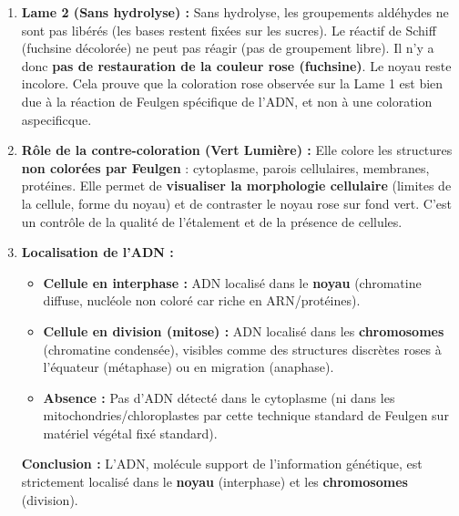 \documentclass[11pt]{article}
\begin{document}
\begin{exoresolu}
\begin{enumerate}
    \item \textbf{Lame 2 (Sans hydrolyse) :} Sans hydrolyse, les groupements aldéhydes ne sont pas libérés (les bases restent fixées sur les sucres). Le réactif de Schiff (fuchsine décolorée) ne peut pas réagir (pas de groupement  libre). Il n'y a donc \textbf{pas de restauration de la couleur rose (fuchsine)}. Le noyau reste incolore. Cela prouve que la coloration rose observée sur la Lame 1 est bien due à la réaction de Feulgen spécifique de l'ADN, et non à une coloration aspecificque.
    \item \textbf{Rôle de la contre-coloration (Vert Lumière) :} Elle colore les structures \textbf{non colorées par Feulgen} : cytoplasme, parois cellulaires, membranes, protéines. Elle permet de \textbf{visualiser la morphologie cellulaire} (limites de la cellule, forme du noyau) et de contraster le noyau rose sur fond vert. C'est un contrôle de la qualité de l'étalement et de la présence de cellules.
    \item \textbf{Localisation de l'ADN :}
        \begin{itemize}
            \item \textbf{Cellule en interphase :} ADN localisé dans le \textbf{noyau} (chromatine diffuse, nucléole non coloré car riche en ARN/protéines).
            \item \textbf{Cellule en division (mitose) :} ADN localisé dans les \textbf{chromosomes} (chromatine condensée), visibles comme des structures discrètes roses à l'équateur (métaphase) ou en migration (anaphase).
            \item \textbf{Absence :} Pas d'ADN détecté dans le cytoplasme (ni dans les mitochondries/chloroplastes par cette technique standard de Feulgen sur matériel végétal fixé standard).
        \end{itemize}
        \textbf{Conclusion :} L'ADN, molécule support de l'information génétique, est strictement localisé dans le \textbf{noyau} (interphase) et les \textbf{chromosomes} (division).
\end{enumerate}
\end{exoresolu}
\end{document}
